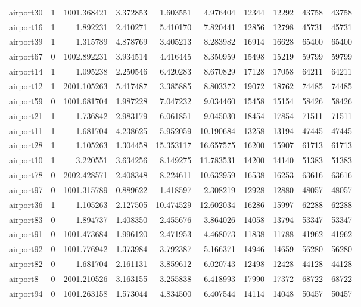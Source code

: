\begin{longtable}{|l|r|r|r|r|r|r|r|r|r|}
airport30 & 1 & 1001.368421 & 3.372853 & 1.603551 & 4.976404 & 12344 & 12292 & 43758 & 43758 \\
airport16 & 1 & 1.892231 & 2.410271 & 5.410170 & 7.820441 & 12856 & 12798 & 45731 & 45731 \\
airport39 & 1 & 1.315789 & 4.878769 & 3.405213 & 8.283982 & 16914 & 16628 & 65400 & 65400 \\
airport67 & 0 & 1002.892231 & 3.934514 & 4.416445 & 8.350959 & 15498 & 15219 & 59799 & 59799 \\
airport14 & 1 & 1.095238 & 2.250546 & 6.420283 & 8.670829 & 17128 & 17058 & 64211 & 64211 \\
airport12 & 1 & 2001.105263 & 5.417487 & 3.385885 & 8.803372 & 19072 & 18762 & 74485 & 74485 \\
airport59 & 0 & 1001.681704 & 1.987228 & 7.047232 & 9.034460 & 15458 & 15154 & 58426 & 58426 \\
airport21 & 1 & 1.736842 & 2.983179 & 6.061851 & 9.045030 & 18454 & 17854 & 71511 & 71511 \\
airport11 & 1 & 1.681704 & 4.238625 & 5.952059 & 10.190684 & 13258 & 13194 & 47445 & 47445 \\
airport28 & 1 & 1.105263 & 1.304458 & 15.353117 & 16.657575 & 16200 & 15907 & 61713 & 61713 \\
airport10 & 1 & 3.220551 & 3.634256 & 8.149275 & 11.783531 & 14200 & 14140 & 51383 & 51383 \\
airport78 & 0 & 2002.428571 & 2.408348 & 8.224611 & 10.632959 & 16538 & 16253 & 63616 & 63616 \\
airport97 & 0 & 1001.315789 & 0.889622 & 1.418597 & 2.308219 & 12928 & 12880 & 48057 & 48057 \\
airport36 & 1 & 1.105263 & 2.127505 & 10.474529 & 12.602034 & 16286 & 15997 & 62288 & 62288 \\
airport83 & 0 & 1.894737 & 1.408350 & 2.455676 & 3.864026 & 14058 & 13794 & 53347 & 53347 \\
airport91 & 0 & 1001.473684 & 1.996120 & 2.471953 & 4.468073 & 11838 & 11788 & 41962 & 41962 \\
airport92 & 0 & 1001.776942 & 1.373984 & 3.792387 & 5.166371 & 14946 & 14659 & 56280 & 56280 \\
airport82 & 0 & 1.681704 & 2.161131 & 3.859612 & 6.020743 & 12498 & 12428 & 44128 & 44128 \\
airport8 & 0 & 2001.210526 & 3.163155 & 3.255838 & 6.418993 & 17990 & 17372 & 68722 & 68722 \\
airport94 & 0 & 1001.263158 & 1.573044 & 4.834500 & 6.407544 & 14114 & 14048 & 50457 & 50457 \\

\end{longtable}
